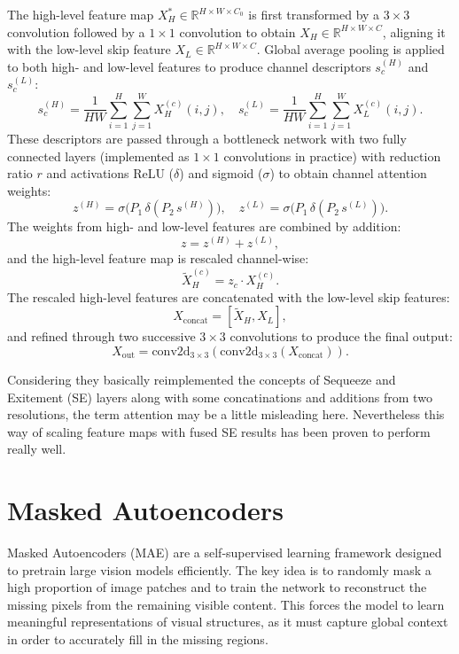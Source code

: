 The high-level feature map $X_H^\ast \in \mathbb{R}^{H \times W \times C_0}$ is first transformed by a $3 \times 3$ convolution followed by a $1 \times 1$ convolution to obtain $X_H \in \mathbb{R}^{H \times W \times C}$, aligning it with the low-level skip feature $X_L \in \mathbb{R}^{H \times W \times C}$. Global average pooling is applied to both high- and low-level features to produce channel descriptors $s_c^{(H)}$ and $s_c^{(L)}$:
\[
s_c^{(H)} = \frac{1}{H W} \sum_{i=1}^{H} \sum_{j=1}^{W} X_H^{(c)}(i,j), \quad
s_c^{(L)} = \frac{1}{H W} \sum_{i=1}^{H} \sum_{j=1}^{W} X_L^{(c)}(i,j).
\]
These descriptors are passed through a bottleneck network with two fully connected layers (implemented as $1 \times 1$ convolutions in practice) with reduction ratio $r$ and activations ReLU ($\delta$) and sigmoid ($\sigma$) to obtain channel attention weights:
\[
z^{(H)} = \sigma \big( P_1 \, \delta(P_2 \, s^{(H)}) \big), \quad
z^{(L)} = \sigma \big( P_1 \, \delta(P_2 \, s^{(L)}) \big).
\]
The weights from high- and low-level features are combined by addition:
\[
z = z^{(H)} + z^{(L)},
\]
and the high-level feature map is rescaled channel-wise:
\[
\tilde{X}_H^{(c)} = z_c \cdot X_H^{(c)}.
\]
The rescaled high-level features are concatenated with the low-level skip features:
\[
X_{\text{concat}} = [\tilde{X}_H, X_L],
\]
and refined through two successive $3 \times 3$ convolutions to produce the final output:
\[
X_{\text{out}} = \text{conv2d}_{3 \times 3}(\text{conv2d}_{3 \times 3}(X_{\text{concat}})).
\]

Considering they basically reimplemented the concepts of Sequeeze and Exitement (SE) layers along with some concatinations and additions from two resolutions, the term attention may be a little misleading here. Nevertheless this way of scaling feature maps with fused SE results has been proven to perform really well.


\section{Masked Autoencoders}

Masked Autoencoders (MAE) are a self-supervised learning framework designed to pretrain large vision models efficiently. The key idea is to randomly mask a high proportion of image patches and to train the network to reconstruct the missing pixels from the remaining visible content. This forces the model to learn meaningful representations of visual structures, as it must capture global context in order to accurately fill in the missing regions. 

